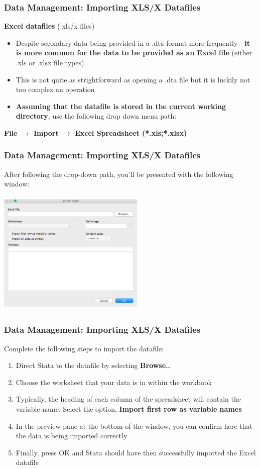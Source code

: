 \documentclass[10pt, compress]{beamer}
\begin{document}
\begin{frame}[fragile]
\frametitle{Data Management: Importing XLS/X Datafiles}
\textbf{Excel datafiles} (.xls/x files)
\begin{itemize}
	\item Despite secondary data being provided in a .dta format more frequently - \textbf{it is more common for the data to be provided as an Excel file} (either .xls or .xlsx file types)
	\item This is not quite as strightforward as opening a .dta file but it is luckily not too complex an operation
	\item \textbf{Assuming that the datafile is stored in the current working directory}, use the following drop down menu path:
\end{itemize}
\begin{center}
\textbf{File $\to$ Import $\to$ Excel Spreadsheet (*.xls;*.xlsx)}
\end{center}
\end{frame}

\begin{frame}[fragile]
\frametitle{Data Management: Importing XLS/X Datafiles}
 After following the drop-down path, you'll be presented with the following window:
\begin{center}
\includegraphics[width=7cm,height=6cm,keepaspectratio]{xls.png}
\end{center}
\end{frame}

\begin{frame}[fragile]
\frametitle{Data Management: Importing XLS/X Datafiles}
Complete the following steps to import the datafile:
\begin{enumerate}
	\item Direct Stata to the datafile by selecting \textbf{Browse..}
	\item Choose the worksheet that your data is in within the workbook
	\item Typically, the heading of each column of the spreadsheet will contain the variable name. Select the option, \textbf{Import first row as variable names}
	\item In the preview pane at the bottom of the window, you can confirm here that the data is being imported correctly
	\item Finally, press OK and Stata should have then successfully imported the Excel datafile
\end{enumerate}
\end{frame}
\end{document}
